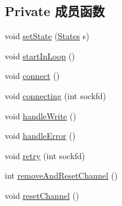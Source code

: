 \subsection*{Private 成员函数}
\begin{DoxyCompactItemize}
\item 
void \hyperlink{classmuduo_1_1Connector_ab987a8e9ac6b0ad825674ec2131921af}{set\+State} (\hyperlink{classmuduo_1_1Connector_a808e5cd4979462d3bbe3070d7d147444}{States} s)
\item 
void \hyperlink{classmuduo_1_1Connector_ad289b54db652dcb10f835f3613e68fdb}{start\+In\+Loop} ()
\item 
void \hyperlink{classmuduo_1_1Connector_a1396bf9b5defe9fa844a63b5cd40ac0e}{connect} ()
\item 
void \hyperlink{classmuduo_1_1Connector_a2e3471f37486a133ee848ea72ed7efc2}{connecting} (int sockfd)
\item 
void \hyperlink{classmuduo_1_1Connector_ae1d79ff6580eaced59a900144818150d}{handle\+Write} ()
\item 
void \hyperlink{classmuduo_1_1Connector_a70b275e63748ddd6da7d2171c540ccff}{handle\+Error} ()
\item 
void \hyperlink{classmuduo_1_1Connector_a6a23d487c31355d8663ccdd4cbf4f499}{retry} (int sockfd)
\item 
int \hyperlink{classmuduo_1_1Connector_abf9772658904f185215158e0dbdf9610}{remove\+And\+Reset\+Channel} ()
\item 
void \hyperlink{classmuduo_1_1Connector_aeb215fb4b2ea3598389e881b87a49631}{reset\+Channel} ()
\end{DoxyCompactItemize}

